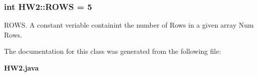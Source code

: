 \subsubsection{\setlength{\rightskip}{0pt plus 5cm}int {\bf HW2::ROWS} = 5\hspace{0.3cm}{\tt  [static, package]}}\label{class_h_w2_f5459446cfa93ffcf2a0b7b99b4531f0}


ROWS. A constant veriable containint the number of Rows in a given array Num Rows. 



The documentation for this class was generated from the following file:\begin{CompactItemize}
\item 
{\bf HW2.java}\end{CompactItemize}
